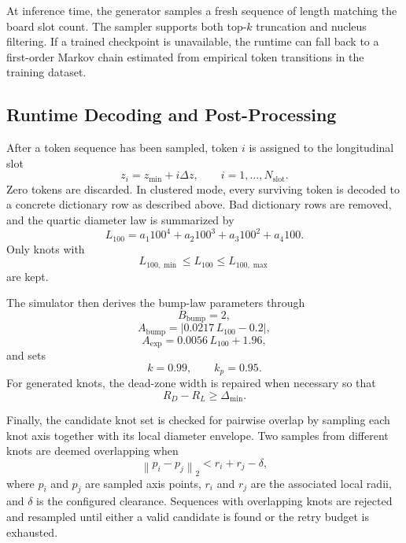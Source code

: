 \documentclass[11pt]{article}
\begin{document}
At inference time, the generator samples a fresh sequence of length matching the board slot count. The sampler
supports both top-$k$ truncation and nucleus filtering. If a trained checkpoint is unavailable, the runtime can
fall back to a first-order Markov chain estimated from empirical token transitions in the training dataset.

\subsection{Runtime Decoding and Post-Processing}

After a token sequence has been sampled, token $i$ is assigned to the longitudinal slot
\begin{equation}
z_i = z_{\min} + i \Delta z,
\qquad i = 1,\ldots,N_{\mathrm{slot}}.
\end{equation}
Zero tokens are discarded. In clustered mode, every surviving token is decoded to a concrete dictionary row as
described above. Bad dictionary rows are removed, and the quartic diameter law is summarized by
\begin{equation}
L_{100} = a_1 100^4 + a_2 100^3 + a_3 100^2 + a_4 100.
\end{equation}
Only knots with
\begin{equation}
L_{100,\min} \le L_{100} \le L_{100,\max}
\end{equation}
are kept.

The simulator then derives the bump-law parameters through
\begin{equation}
B_{\mathrm{bump}} = 2,
\end{equation}
\begin{equation}
A_{\mathrm{bump}} = \left|0.0217\,L_{100} - 0.2\right|,
\end{equation}
\begin{equation}
A_{\mathrm{exp}} = 0.0056\,L_{100} + 1.96,
\end{equation}
and sets
\begin{equation}
k = 0.99, \qquad k_p = 0.95.
\end{equation}
For generated knots, the dead-zone width is repaired when necessary so that
\begin{equation}
R_D - R_L \ge \Delta_{\min}.
\end{equation}

Finally, the candidate knot set is checked for pairwise overlap by sampling each knot axis together with its
local diameter envelope. Two samples from different knots are deemed overlapping when
\begin{equation}
\left\lVert p_i - p_j \right\rVert_2 < r_i + r_j - \delta,
\end{equation}
where $p_i$ and $p_j$ are sampled axis points, $r_i$ and $r_j$ are the associated local radii, and $\delta$ is
the configured clearance. Sequences with overlapping knots are rejected and resampled until either a valid
candidate is found or the retry budget is exhausted.
\end{document}

